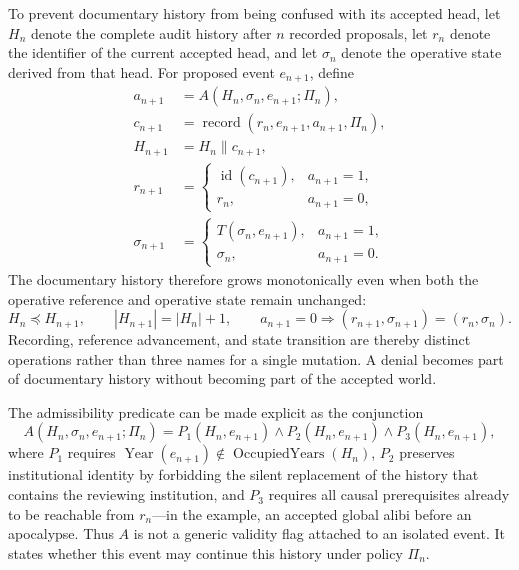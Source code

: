 \documentclass[11pt]{article}
\begin{document}
To prevent documentary history from being confused with its accepted head, let $H_n$ denote the complete audit history after $n$ recorded proposals, let $r_n$ denote the identifier of the current accepted head, and let $\sigma_n$ denote the operative state derived from that head. For proposed event $e_{n+1}$, define
\begin{align}
  a_{n+1} &= A(H_n,\sigma_n,e_{n+1};\Pi_n),\\
  c_{n+1} &= \operatorname{record}(r_n,e_{n+1},a_{n+1},\Pi_n),\\
  H_{n+1} &= H_n\mathbin{\|}c_{n+1},\\
  r_{n+1} &=
  \begin{cases}
    \operatorname{id}(c_{n+1}), & a_{n+1}=1,\\
    r_n, & a_{n+1}=0,
  \end{cases}\\
  \sigma_{n+1} &=
  \begin{cases}
    T(\sigma_n,e_{n+1}), & a_{n+1}=1,\\
    \sigma_n, & a_{n+1}=0.
  \end{cases}
\end{align}
The documentary history therefore grows monotonically even when both the operative reference and operative state remain unchanged:
\begin{equation}
  H_n\preceq H_{n+1},
  \qquad |H_{n+1}|=|H_n|+1,
  \qquad a_{n+1}=0\Longrightarrow
  (r_{n+1},\sigma_{n+1})=(r_n,\sigma_n).
  \label{eq:audit-monotonicity}
\end{equation}
Recording, reference advancement, and state transition are thereby distinct operations rather than three names for a single mutation. A denial becomes part of documentary history without becoming part of the accepted world.

The admissibility predicate can be made explicit as the conjunction
\begin{equation}
  A(H_n,\sigma_n,e_{n+1};\Pi_n) = P_1(H_n,e_{n+1}) \land
                   P_2(H_n,e_{n+1}) \land
                   P_3(H_n,e_{n+1}),
  \label{eq:admissibility-conjunction}
\end{equation}
where $P_1$ requires $\operatorname{Year}(e_{n+1})\notin\operatorname{OccupiedYears}(H_n)$, $P_2$ preserves institutional identity by forbidding the silent replacement of the history that contains the reviewing institution, and $P_3$ requires all causal prerequisites already to be reachable from $r_n$---in the example, an accepted global alibi before an apocalypse. Thus $A$ is not a generic validity flag attached to an isolated event. It states whether this event may continue this history under policy $\Pi_n$.
\end{document}
